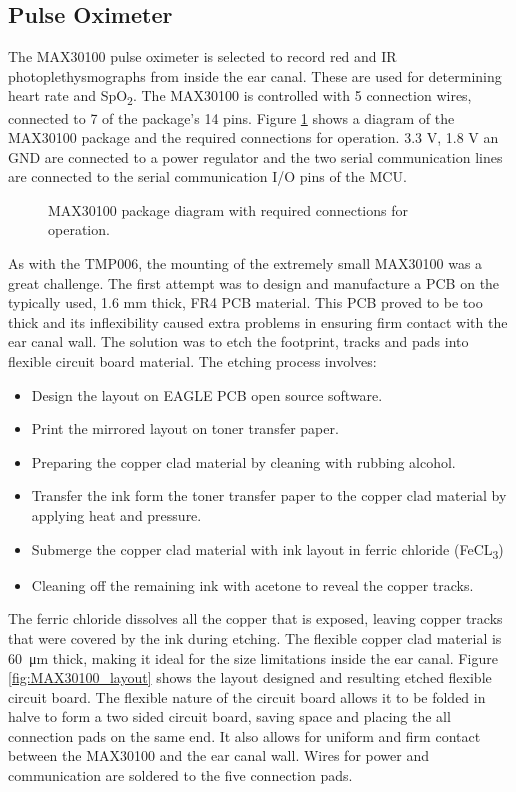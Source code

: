 \subsection{Pulse Oximeter}
The MAX30100 pulse oximeter is selected to record red and IR photoplethysmographs from inside the ear canal. These are used for determining heart rate and SpO\textsubscript{2}. The MAX30100 is controlled with 5 connection wires, connected to 7 of the package's 14 pins. Figure \ref{fig:MAX30100_pinout} shows a diagram of the MAX30100 package and the required connections for operation. 3.3 V, 1.8 V an GND are connected to a power regulator and the two serial communication lines are connected to the serial communication I/O pins of the MCU.

\begin{figure}[H]
\centering
\graphicspath{{figs/}}
\def\svgwidth{180pt}

\caption{MAX30100 package diagram with required connections for operation.}
\label{fig:MAX30100_pinout}
\end{figure}

As with the TMP006, the mounting of the extremely small MAX30100 was a great challenge. The first attempt was to design and manufacture a PCB on the typically used, 1.6 mm thick, FR4 PCB material. This PCB proved to be too thick and its inflexibility caused extra problems in ensuring firm contact with the ear canal wall. The solution was to etch the footprint, tracks and pads into flexible circuit board material. The etching process involves:
\begin{itemize}
\item Design the layout on EAGLE PCB open source software.
\item Print the mirrored layout on toner transfer paper.
\item Preparing the copper clad material by cleaning with rubbing alcohol.
\item Transfer the ink form the toner transfer paper to the copper clad material by applying heat and pressure.
\item Submerge the copper clad material with ink layout in ferric chloride (FeCL\textsubscript{3})
\item Cleaning off the remaining ink with acetone to reveal the copper tracks.
\end{itemize} 

The ferric chloride dissolves all the copper that is exposed, leaving copper tracks that were covered by the ink during etching. The flexible copper clad material is \SI{60}{\micro\meter} thick, making it ideal for the size limitations inside the ear canal. Figure \ref{fig:MAX30100_layout} shows the layout designed and resulting etched flexible circuit board. The flexible nature of the circuit board allows it to be folded in halve to form a two sided circuit board, saving space and placing the all connection pads on the same end. It also allows for uniform and firm contact between the MAX30100 and the ear canal wall. Wires for power and communication are soldered to the five connection pads.

